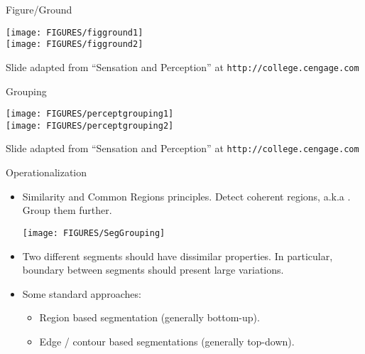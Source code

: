 \documentclass[9pt]{beamer}
\newcommand{\myemph}[1]{{\color{blue}{#1}}}
\begin{document}
\begin{frame}[t]{Figure/Ground}
  \begin{center}
    \texttt{[image: FIGURES/figground1]}\\
    \texttt{[image: FIGURES/figground2]}\\
  \end{center}
  \vfill
  {\fontsize{6}{6}\selectfont Slide adapted from ``Sensation and Perception'' at \texttt{http://college.cengage.com}}
\end{frame}


\begin{frame}[t]{Grouping}
  \begin{center}
    \texttt{[image: FIGURES/perceptgrouping1]}\\
    \texttt{[image: FIGURES/perceptgrouping2]}\\
  \end{center}
  \vfill
  {\fontsize{6}{6}\selectfont Slide adapted from ``Sensation and Perception'' at \texttt{http://college.cengage.com}}
\end{frame}

\begin{frame}[t]{Operationalization}
  \begin{itemize}
  \item Similarity and Common Regions principles. Detect coherent regions, a.k.a \myemph{segments}. Group them further.
    \begin{center}
      \texttt{[image: FIGURES/SegGrouping]}
    \end{center}
  \item Two different segments should have dissimilar properties. In
    particular, boundary between segments should present large
    variations.\vfill
  \item Some standard approaches: \vfill
    \begin{itemize}
    \item Region based segmentation (generally bottom-up). \vfill
    \item Edge / contour based segmentations (generally top-down).\vfill
    \end{itemize}
  \end{itemize}
\end{frame}



\end{document}

